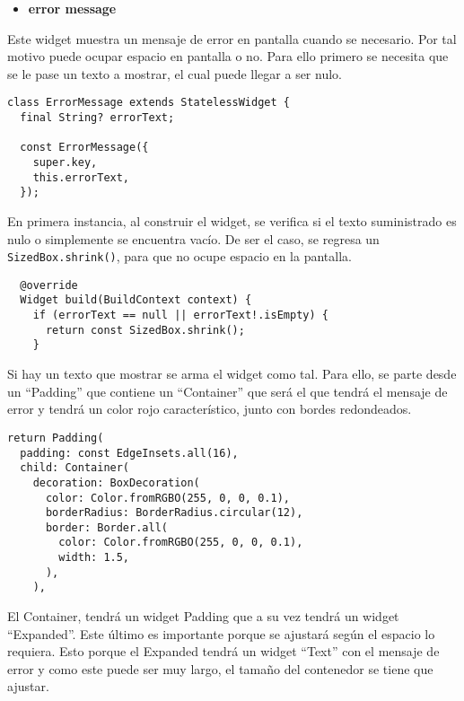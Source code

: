 \begin{itemize}
    \item \textbf{error message}
\end{itemize}

Este widget muestra un mensaje de error en pantalla cuando se necesario. Por tal motivo puede ocupar espacio en pantalla o no. Para ello primero se necesita que se le pase un texto a mostrar, el cual puede llegar a ser nulo.

\begin{center}
\begin{lstlisting}
class ErrorMessage extends StatelessWidget {
  final String? errorText;

  const ErrorMessage({
    super.key,
    this.errorText,
  });
\end{lstlisting}
\end{center}

En primera instancia, al construir el widget, se verifica si el texto suministrado es nulo o simplemente se encuentra vacío. De ser el caso, se regresa un \lstinline{SizedBox.shrink()}, para que no ocupe espacio en la pantalla.

\begin{center}
\begin{lstlisting}
  @override
  Widget build(BuildContext context) {
    if (errorText == null || errorText!.isEmpty) {
      return const SizedBox.shrink();
    }
\end{lstlisting}
\end{center}

Si hay un texto que mostrar se arma el widget como tal. Para ello, se parte desde un “Padding” que contiene un “Container” que será el que tendrá el mensaje de error y tendrá un color rojo característico, junto con bordes redondeados.

\begin{center}
\begin{lstlisting}
return Padding(
  padding: const EdgeInsets.all(16),
  child: Container(
    decoration: BoxDecoration(
      color: Color.fromRGBO(255, 0, 0, 0.1),
      borderRadius: BorderRadius.circular(12),
      border: Border.all(
        color: Color.fromRGBO(255, 0, 0, 0.1),
        width: 1.5,
      ),
    ),
\end{lstlisting}
\end{center}

El Container, tendrá un widget Padding que a su vez tendrá un widget “Expanded”. Este último es importante porque se ajustará según el espacio lo requiera. Esto porque el Expanded tendrá un widget “Text” con el mensaje de error y como este puede ser muy largo, el tamaño del contenedor se tiene que ajustar. 

